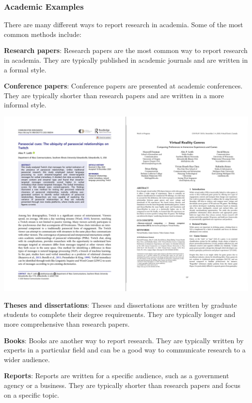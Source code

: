 \documentclass[
]{book}
\begin{document}
\subsubsection*{Academic Examples}\label{academic-examples}

There are many different ways to report research in academia. Some of the most common methods include:

\textbf{Research papers}: Research papers are the most common way to report research in academia. They are typically published in academic journals and are written in a formal style.

\textbf{Conference papers}: Conference papers are presented at academic conferences. They are typically shorter than research papers and are written in a more informal style.

\includegraphics[width=1\textwidth,height=\textheight]{images/papers.png}

\textbf{Theses and dissertations}: Theses and dissertations are written by graduate students to complete their degree requirements. They are typically longer and more comprehensive than research papers.

\textbf{Books}: Books are another way to report research. They are typically written by experts in a particular field and can be a good way to communicate research to a wider audience.

\textbf{Reports}: Reports are written for a specific audience, such as a government agency or a business. They are typically shorter than research papers and focus on a specific topic.
\end{document}
